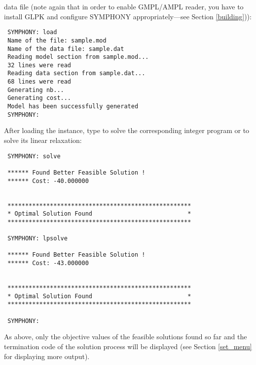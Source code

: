 data file (note again that in order to enable GMPL/AMPL reader, you have to
install GLPK and configure SYMPHONY appropriately---see Section
\ref{building})): 
{\color{Brown}
\begin{verbatim}
 SYMPHONY: load 
 Name of the file: sample.mod
 Name of the data file: sample.dat
 Reading model section from sample.mod...
 32 lines were read
 Reading data section from sample.dat...
 68 lines were read
 Generating nb...
 Generating cost...
 Model has been successfully generated
 SYMPHONY:
\end{verbatim}
}
After loading the instance, type  to solve the 
corresponding integer program or  to solve its linear
relaxation:
{\color{Brown}
\begin{verbatim}
 SYMPHONY: solve

 ****** Found Better Feasible Solution !
 ****** Cost: -40.000000


 ****************************************************
 * Optimal Solution Found                           *
 ****************************************************

 SYMPHONY: lpsolve

 ****** Found Better Feasible Solution !
 ****** Cost: -43.000000


 ****************************************************
 * Optimal Solution Found                           *
 ****************************************************

 SYMPHONY:
\end{verbatim}
}
As above, only the objective values of the feasible solutions found so far and 
the termination code of the solution process will be displayed (see Section 
\ref{set_menu} for displaying more output).

